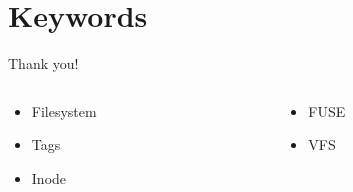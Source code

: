 \documentclass{beamer}
\begin{document}
\section{Keywords}
\begin{frame}{Thank you!} 
\begin{columns}
	\begin{column}[l]{0.5\textwidth}
	  \begin{itemize}
        \item Filesystem
        \item Tags
        \item Inode
	  \end{itemize}
	\end{column}
	\begin{column}[c]{0.5\textwidth}
	  \begin{itemize}
        \item FUSE 
        \item VFS
	  \end{itemize}    
	\end{column}
      \end{columns}

\end{frame}
\end{document}
